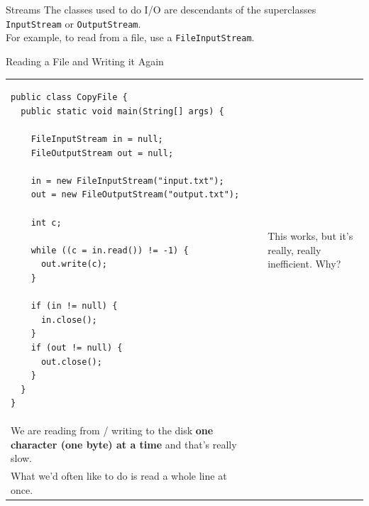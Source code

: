 \documentclass[aspectratio=169]{beamer}
\makeatletter
\newenvironment{splitslide}
{
\centering
\begin{tabular}{@{}p{0.50\textwidth} | p{0.025\textwidth}@{} p{0.4\textwidth}@{}}
}
{
\end{tabular}
}
\makeatother
\begin{document}
\begin{frame}{Streams}
The classes used to do I/O are descendants of the superclasses \texttt{InputStream} or \texttt{OutputStream}.  \\
\vspace{2em}
For example, to read from a file, use a \texttt{FileInputStream}. 
\end{frame}



\begin{frame}[fragile]{Reading a File and Writing it Again}

\begin{splitslide}

\begin{Verbatim}[fontsize=\tiny]
public class CopyFile {
  public static void main(String[] args) {

    FileInputStream in = null;
    FileOutputStream out = null;

    in = new FileInputStream("input.txt");
    out = new FileOutputStream("output.txt");
    
    int c;

    while ((c = in.read()) != -1) {
      out.write(c);
    }
            
    if (in != null) {
      in.close();
    }
    if (out != null) {
      out.close();
    }
  }
}
\end{Verbatim}

&&

\pause
\raggedright
This works, but it's really, really inefficient. Why? \\
\pause
\vspace{2em}
We are reading from / writing to the disk \textbf{one character (one byte) at a time} and that's really slow. \\
\pause
\vspace{2em}
What we'd often like to do is read a whole line at once. \\

\end{splitslide}

\end{frame}
\end{document}
